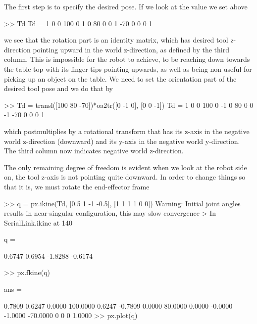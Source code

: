 \documentclass[11pt]{article}
\begin{document}
The first step is to specify the desired pose.  If we look at the value we set above
\begin{Code}
>> Td
Td =
     1     0     0   100
     0     1     0    80
     0     0     1   -70
     0     0     0     1
\end{Code}
we see that the rotation part is an identity matrix, which has desired tool z-direction pointing upward in the world z-direction, as defined by the
third column.  This is impossible for the robot to achieve, to be reaching down towards the table top with its finger tips pointing upwards, as
well as being non-useful for picking up an object on the table.
We need to set the orientation part of the desired tool pose and we do that by
\begin{Code}
>> Td = transl([100 80 -70])*oa2tr([0 -1 0], [0 0 -1])
Td =
     1     0     0   100
     0    -1     0    80
     0     0    -1   -70
     0     0     0     1

\end{Code}
which postmultiplies by a rotational transform that has its z-axis in the negative world z-direction (downward) and its y-axis in the negative world y-direction.	The third column now indicates negative world z-direction.

The only remaining degree of freedom is evident when we look at the robot side on, the tool z-axis is not pointing quite downward.
In order to change things so that it is, we must rotate the end-effector frame 

\begin{Code}
>> q = px.ikine(Td, [0.5 1 -1 -0.5], [1 1 1 1 0 0])
Warning: Initial joint angles results in near-singular configuration, this may slow convergence 
> In SerialLink.ikine at 140 

q =

    0.6747    0.6954   -1.8288   -0.6174

>> px.fkine(q)

ans =

    0.7809    0.6247    0.0000  100.0000
    0.6247   -0.7809    0.0000   80.0000
    0.0000   -0.0000   -1.0000  -70.0000
         0         0         0    1.0000
>> px.plot(q)
\end{Code}




\end{document}
